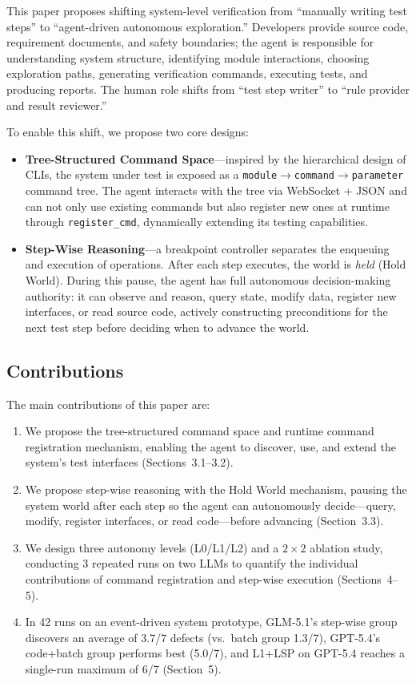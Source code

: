 \documentclass[sigconf,nonacm]{acmart}
\begin{document}
This paper proposes shifting system-level verification from ``manually writing test steps'' to ``agent-driven autonomous exploration.'' Developers provide source code, requirement documents, and safety boundaries; the agent is responsible for understanding system structure, identifying module interactions, choosing exploration paths, generating verification commands, executing tests, and producing reports. The human role shifts from ``test step writer'' to ``rule provider and result reviewer.''

To enable this shift, we propose two core designs:

\begin{itemize}
\item \textbf{Tree-Structured Command Space}---inspired by the hierarchical design of CLIs, the system under test is exposed as a \texttt{module$\to$command$\to$parameter} command tree. The agent interacts with the tree via WebSocket + JSON and can not only use existing commands but also register new ones at runtime through \texttt{register\_cmd}, dynamically extending its testing capabilities.

\item \textbf{Step-Wise Reasoning}---a breakpoint controller separates the enqueuing and execution of operations. After each step executes, the world is \emph{held} (Hold World). During this pause, the agent has full autonomous decision-making authority: it can observe and reason, query state, modify data, register new interfaces, or read source code, actively constructing preconditions for the next test step before deciding when to advance the world.
\end{itemize}

\subsection{Contributions}

The main contributions of this paper are:

\begin{enumerate}
\item We propose the tree-structured command space and runtime command registration mechanism, enabling the agent to discover, use, and extend the system's test interfaces (Sections~3.1--3.2).
\item We propose step-wise reasoning with the Hold World mechanism, pausing the system world after each step so the agent can autonomously decide---query, modify, register interfaces, or read code---before advancing (Section~3.3).
\item We design three autonomy levels (L0/L1/L2) and a $2\times2$ ablation study, conducting 3 repeated runs on two LLMs to quantify the individual contributions of command registration and step-wise execution (Sections~4--5).
\item In 42 runs on an event-driven system prototype, GLM-5.1's step-wise group discovers an average of 3.7/7 defects (vs.\ batch group 1.3/7), GPT-5.4's code+batch group performs best (5.0/7), and L1+LSP on GPT-5.4 reaches a single-run maximum of 6/7 (Section~5).
\end{enumerate}
\end{document}
